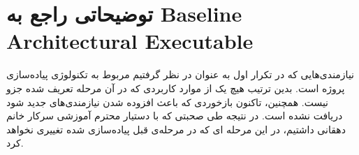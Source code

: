 \section{توضیحاتی راجع به Baseline Architectural Executable}
نیازمندی‌هایی که در تکرار اول به عنوان 
در نظر گرفتیم مربوط به تکنولوژی پیاده‌سازی پروژه است. بدین ترتیب هیچ یک از موارد کاربردی که در آن مرحله تعریف شده جزو
 نیست. همچنین، تاکنون بازخوردی که باعث افزوده شدن نیازمندی‌های جدید شود دریافت نشده است. در نتیجه طی صحبتی که با دستیار محترم آموزشی سرکار خانم دهقانی داشتیم، در این مرحله
  ای
 که در مرحله‌ی قبل پیاده‌سازی شده تغییری نخواهد کرد.